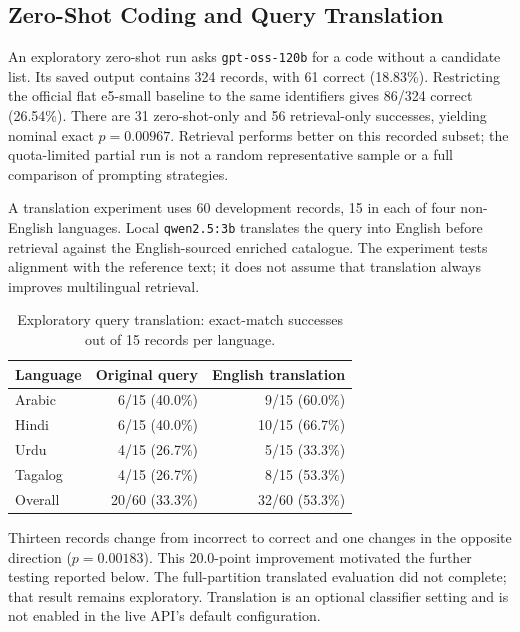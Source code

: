 \subsection{Zero-Shot Coding and Query Translation}
\label{sec:results-translation}

An exploratory zero-shot run asks \texttt{gpt-oss-120b} for a code without
a candidate list. Its saved output contains 324 records, with 61 correct
(18.83\%). Restricting the official flat e5-small baseline to the same
identifiers gives 86/324 correct (26.54\%). There are 31 zero-shot-only
and 56 retrieval-only successes, yielding nominal exact $p=0.00967$.
Retrieval performs better on this recorded subset; the quota-limited
partial run is not a random representative sample or a full comparison
of prompting strategies.

A translation experiment uses 60 development records, 15 in each of four
non-English languages. Local \texttt{qwen2.5:3b} translates the query into
English before retrieval against the English-sourced enriched catalogue.
The experiment tests alignment with the reference text; it does not assume
that translation always improves multilingual retrieval.

\begin{table}[htbp]
\centering
\caption{Exploratory query translation: exact-match successes out of 15
records per language.}
\label{tab:ch6-translation}
\small\renewcommand{\arraystretch}{1.3}
\begin{tabular}{lrr}
\toprule
\textbf{Language} & \textbf{Original query} & \textbf{English translation} \\
\midrule
Arabic & 6/15 (40.0\%) & 9/15 (60.0\%) \\
Hindi & 6/15 (40.0\%) & 10/15 (66.7\%) \\
Urdu & 4/15 (26.7\%) & 5/15 (33.3\%) \\
Tagalog & 4/15 (26.7\%) & 8/15 (53.3\%) \\
\midrule
Overall & 20/60 (33.3\%) & 32/60 (53.3\%) \\
\bottomrule
\end{tabular}
\end{table}

Thirteen records change from incorrect to correct and one changes in the
opposite direction ($p=0.00183$). This 20.0-point improvement motivated
the further testing reported below. The full-partition translated
evaluation did not complete; that result remains exploratory. Translation
is an optional classifier setting and is not enabled in the live API's
default configuration.

